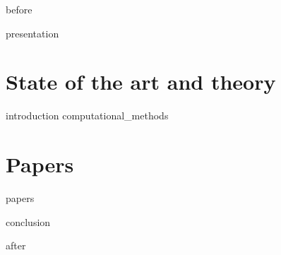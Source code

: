\documentclass[
    12pt,
openright,             %
    twoside,               %
    a4paper,
french,            %
ngerman,           %
spanish,           %
brazil,            %
british,           %
    ]{abntex2}
\begin{document}
{before}

\textual{}  %

{presentation}

\part{State of the art and theory}

{introduction}
{computational_methods}


\part{Papers}

{papers}



{conclusion}

\postextual{}  %


{after}
\end{document}
